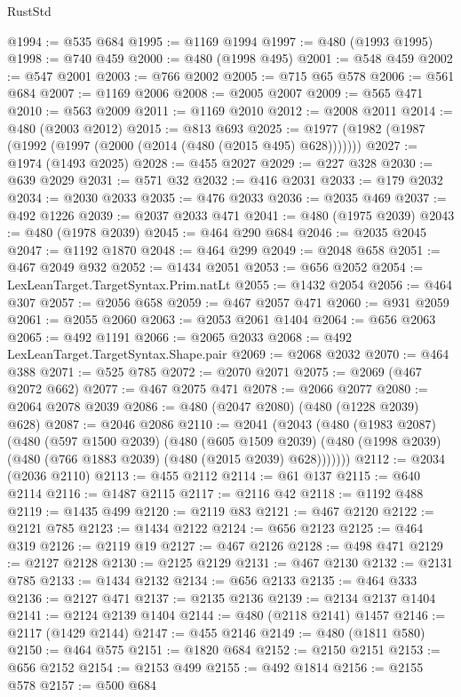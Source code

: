 \begin{lexlean}{RustStd}
\begin{coremodule}
@1994 := @535 @684
@1995 := @1169 @1994
@1997 := @480 (@1993 @1995)
@1998 := @740 @459
@2000 := @480 (@1998 @495)
@2001 := @548 @459
@2002 := @547 @2001
@2003 := @766 @2002
@2005 := @715 @65 @578
@2006 := @561 @684
@2007 := @1169 @2006
@2008 := @2005 @2007
@2009 := @565 @471
@2010 := @563 @2009
@2011 := @1169 @2010
@2012 := @2008 @2011
@2014 := @480 (@2003 @2012)
@2015 := @813 @693
@2025 := @1977 (@1982 (@1987 (@1992 (@1997 (@2000 (@2014 (@480 (@2015 @495) @628)))))))
@2027 := @1974 (@1493 @2025)
@2028 := @455 @2027
@2029 := @227 @328
@2030 := @639 @2029
@2031 := @571 @32
@2032 := @416 @2031
@2033 := @179 @2032
@2034 := @2030 @2033
@2035 := @476 @2033
@2036 := @2035 @469
@2037 := @492 @1226
@2039 := @2037 @2033 @471
@2041 := @480 (@1975 @2039)
@2043 := @480 (@1978 @2039)
@2045 := @464 @290 @684
@2046 := @2035 @2045
@2047 := @1192 @1870
@2048 := @464 @299
@2049 := @2048 @658
@2051 := @467 @2049 @932
@2052 := @1434 @2051
@2053 := @656 @2052
@2054 := LexLeanTarget.TargetSyntax.Prim.natLt
@2055 := @1432 @2054
@2056 := @464 @307
@2057 := @2056 @658
@2059 := @467 @2057 @471
@2060 := @931 @2059
@2061 := @2055 @2060
@2063 := @2053 @2061 @1404
@2064 := @656 @2063
@2065 := @492 @1191
@2066 := @2065 @2033
@2068 := @492 LexLeanTarget.TargetSyntax.Shape.pair
@2069 := @2068 @2032
@2070 := @464 @388
@2071 := @525 @785
@2072 := @2070 @2071
@2075 := @2069 (@467 @2072 @662)
@2077 := @467 @2075 @471
@2078 := @2066 @2077
@2080 := @2064 @2078 @2039
@2086 := @480 (@2047 @2080) (@480 (@1228 @2039) @628)
@2087 := @2046 @2086
@2110 := @2041
    (@2043
      (@480
        (@1983 @2087)
        (@480
          (@597 @1500 @2039)
          (@480
            (@605 @1509 @2039)
            (@480 (@1998 @2039) (@480 (@766 @1883 @2039) (@480 (@2015 @2039) @628)))))))
@2112 := @2034 (@2036 @2110)
@2113 := @455 @2112
@2114 := @61 @137
@2115 := @640 @2114
@2116 := @1487 @2115
@2117 := @2116 @42
@2118 := @1192 @488
@2119 := @1435 @499
@2120 := @2119 @83
@2121 := @467 @2120
@2122 := @2121 @785
@2123 := @1434 @2122
@2124 := @656 @2123
@2125 := @464 @319
@2126 := @2119 @19
@2127 := @467 @2126
@2128 := @498 @471
@2129 := @2127 @2128
@2130 := @2125 @2129
@2131 := @467 @2130
@2132 := @2131 @785
@2133 := @1434 @2132
@2134 := @656 @2133
@2135 := @464 @333
@2136 := @2127 @471
@2137 := @2135 @2136
@2139 := @2134 @2137 @1404
@2141 := @2124 @2139 @1404
@2144 := @480 (@2118 @2141) @1457
@2146 := @2117 (@1429 @2144)
@2147 := @455 @2146
@2149 := @480 (@1811 @580)
@2150 := @464 @575
@2151 := @1820 @684
@2152 := @2150 @2151
@2153 := @656 @2152
@2154 := @2153 @499
@2155 := @492 @1814
@2156 := @2155 @578
@2157 := @500 @684

\end{coremodule}
\end{lexlean}
